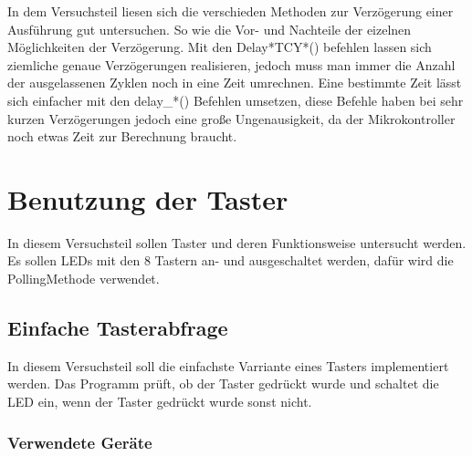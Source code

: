 \documentclass[12pt,a4paper]{article}
\begin{document}
In dem Versuchsteil liesen sich die verschieden Methoden zur Verzögerung einer Ausführung gut untersuchen. So wie die Vor- und Nachteile der eizelnen Möglichkeiten der Verzögerung. Mit den Delay*TCY*() befehlen lassen sich ziemliche genaue Verzögerungen realisieren, jedoch muss man immer die Anzahl der ausgelassenen Zyklen noch in eine Zeit umrechnen. Eine bestimmte Zeit lässt sich einfacher mit den delay\_*() Befehlen umsetzen, diese Befehle haben bei sehr kurzen Verzögerungen jedoch eine große Ungenausigkeit, da der Mikrokontroller noch etwas Zeit zur Berechnung braucht.

\section{Benutzung der Taster}

In diesem Versuchsteil sollen Taster und deren Funktionsweise untersucht werden. Es sollen LEDs mit den 8 Tastern an- und ausgeschaltet werden, dafür wird die PollingMethode verwendet.

\subsection{Einfache Tasterabfrage}

In diesem Versuchsteil soll die einfachste Varriante eines Tasters implementiert werden. Das Programm prüft, ob der Taster gedrückt wurde und schaltet die LED ein, wenn der Taster gedrückt wurde sonst nicht.

\subsubsection*{Verwendete Geräte}
\end{document}
